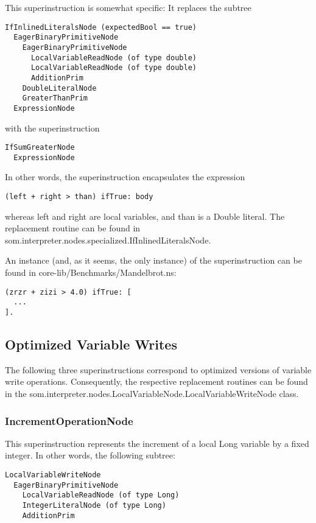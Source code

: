 \documentclass[10pt,a4paper]{article}
\begin{document}
This superinstruction is somewhat specific: It replaces the subtree
\begin{verbatim}
IfInlinedLiteralsNode (expectedBool == true)
  EagerBinaryPrimitiveNode
    EagerBinaryPrimitiveNode
      LocalVariableReadNode (of type double)
      LocalVariableReadNode (of type double)
      AdditionPrim
    DoubleLiteralNode
    GreaterThanPrim
  ExpressionNode
\end{verbatim}
with the superinstruction
\begin{verbatim}
IfSumGreaterNode
  ExpressionNode
\end{verbatim}
In other words, the superinstruction encapsulates the expression
\begin{verbatim}
(left + right > than) ifTrue: body
\end{verbatim}
whereas \textsf{left} and \textsf{right} are local variables, and \textsf{than} is a Double literal. The replacement routine can be found in \textsf{som.interpreter.nodes.specialized{\allowbreak}.IfInlinedLiteralsNode}.

An instance (and, as it seems, the only instance) of the superinstruction can be found in \textsf{core-lib/Benchmarks/Mandelbrot.ns}:
\begin{verbatim}
(zrzr + zizi > 4.0) ifTrue: [
  ...
].
\end{verbatim}


\subsection{Optimized Variable Writes}

The following three superinstructions correspond to optimized versions of variable write operations. Consequently, the respective replacement routines can be found in the \textsf{som.interpreter.{\allowbreak}nodes.LocalVariableNode.{\allowbreak}LocalVariableWriteNode} class.

\subsubsection{IncrementOperationNode}

This superinstruction represents the increment of a local \textsf{Long} variable by a fixed integer.
In other words, the following subtree:

\begin{verbatim}
LocalVariableWriteNode
  EagerBinaryPrimitiveNode
    LocalVariableReadNode (of type Long)
    IntegerLiteralNode (of type Long)
    AdditionPrim
\end{verbatim}
\end{document}
